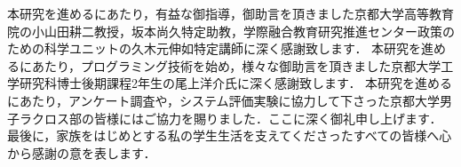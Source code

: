 \documentclass[sotsuron]{kuee}
\begin{document}
\begin{acknowledgements}
	本研究を進めるにあたり，有益な御指導，御助言を頂きました京都大学高等教育院の小山田耕二教授，坂本尚久特定助教，学際融合教育研究推進センター政策のための科学ユニットの久木元伸如特定講師に深く感謝致します．
	本研究を進めるにあたり，プログラミング技術を始め，様々な御助言を頂きました京都大学工学研究科博士後期課程2年生の尾上洋介氏に深く感謝致します．
	本研究を進めるにあたり，アンケート調査や，システム評価実験に協力して下さった京都大学男子ラクロス部の皆様にはご協力を賜りました．ここに深く御礼申し上げます．
	最後に，家族をはじめとする私の学生生活を支えてくださったすべての皆様へ心から感謝の意を表します．
\end{acknowledgements}








\appendix
\end{document}
